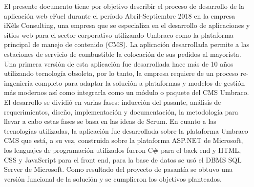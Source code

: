 \documentclass[pregrado]{tesis-usb}
\begin{document}
    \frontmatter
    \maketitle
    \begin{resumen}
        El presente documento tiene por objetivo describir el proceso de desarrollo de la aplicación web eFuel durante el período Abril-Septiembre 2018 en la empresa iKêls Consulting, una empresa que se especializa en el desarrollo de aplicaciones y sitios web para el sector corporativo utilizando Umbraco como la plataforma principal de manejo de contenido (CMS). La aplicación desarrollada permite a las estaciones de servicio de combustible la colocación de sus pedidos al mayorista. Una primera versión de esta aplicación fue desarrollada hace más de 10 años utilizando tecnología obsoleta, por lo tanto, la empresa requiere de un proceso re-ingeniería completo para adaptar la solución a plataformas y modelos de gestión más modernos así como integrarla como un módulo o paquete del CMS Umbraco. El desarrollo se dividió en varias fases: inducción del pasante, análisis de requerimientos, diseño, implementación y documentación, la metodología para llevar a cabo estas fases se basa en las ideas de Scrum. En cuanto a las tecnologías utilizadas, la aplicación fue desarrollada sobre la plataforma Umbraco CMS que está, a su vez, construida sobre la plataforma ASP.NET de Microsoft, los lenguajes de programación utilizados fueron C\# para el back end y HTML, CSS y JavaScript para el front end, para la base de datos se usó el DBMS SQL Server de Microsoft. Como resultado del proyecto de pasantía se obtuvo una versión funcional de la solución y se cumplieron los objetivos planteados.
    \end{resumen}
    \tableofcontents
    \listoffigures

    \mainmatter
    
    
    
    
    
    
    
    
    \nocite{*}
    
    \appendix
    
    
    
\end{document}

